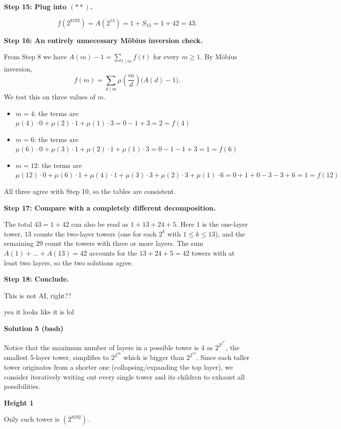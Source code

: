\begin{enumerate}
 \textbf{Step 15: Plug into $(\ast\ast)$.}

 
 \[f(2^{8192})=A(2^{13})=1+S_{13}=1+42=43.\]

 \textbf{Step 16: An entirely unnecessary Möbius inversion check.}

 From Step 8 we have $A(m)-1=\sum_{t\mid m}f(t)$ for every $m\ge1$. By Möbius inversion,
 \[f(m)=\sum_{d\mid m}\mu\!\left(\frac{m}{d}\right)\bigl(A(d)-1\bigr).\]We test this on three values of $m$.

 
            \begin{itemize}
        \item $m=4$: the terms are $\mu(4)\cdot0+\mu(2)\cdot1+\mu(1)\cdot3=0-1+3=2=f(4)$
        \item $m=6$: the terms are $\mu(6)\cdot0+\mu(3)\cdot1+\mu(2)\cdot1+\mu(1)\cdot3=0-1-1+3=1=f(6)$
        \item $m=12$: the terms are $\mu(12)\cdot0+\mu(6)\cdot1+\mu(4)\cdot1+\mu(3)\cdot3+\mu(2)\cdot3+\mu(1)\cdot6=0+1+0-3-3+6=1=f(12)$
            \end{itemize}
            All three agree with Step 10, so the tables are consistent.

 \textbf{Step 17: Compare with a completely different decomposition.}

 The total $43=1+42$ can also be read as $1+13+24+5$. Here $1$ is the one-layer tower, $13$ counts the two-layer towers (one for each $2^k$ with $1\le k\le13$), and the remaining $29$ count the towers with three or more layers. The sum $A(1)+\dots+A(13)=42$ accounts for the $13+24+5=42$ towers with at least two layers, so the two solutions agree.

 \textbf{Step 18: Conclude.}

 This is not AI, right??

 yea it looks like it is lol

 


 



\textbf{Solution 5 (bash)}

Notice that the maximum number of layers in a possible tower is 4 as $2^{2^{2^{2^2}}}$, the smallest 5-layer tower, simplifies to $2^{2^{16}}$ which is bigger than $2^{2^{13}}$. Since each taller tower originates from a shorter one (collapsing/expanding the top layer), we consider iteratively writing out every single tower and its children to exhaust all possibilities.

 
\textbf{Height 1}

 Only such tower is $(2^{8192})$.


\end{enumerate}

